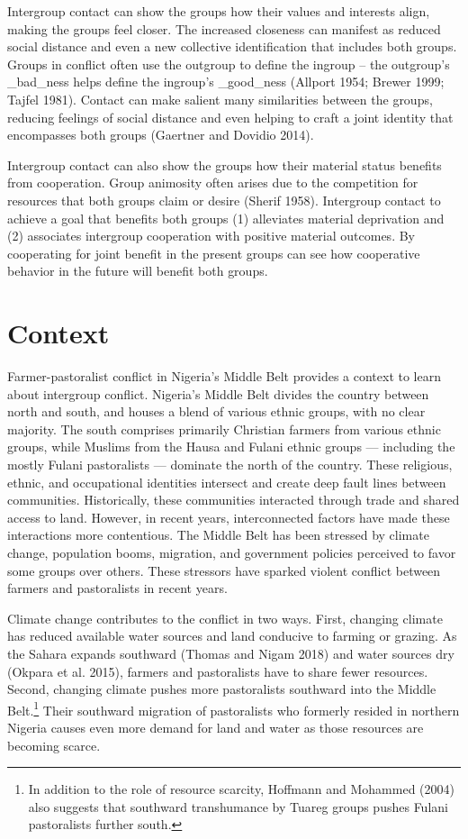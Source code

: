 \documentclass[11pt]{article}
\begin{document}
Intergroup contact can show the groups how their values and interests
align, making the groups feel closer. The increased closeness can
manifest as reduced social distance and even a new collective
identification that includes both groups. Groups in conflict often use
the outgroup to define the ingroup -- the outgroup's \_bad\_ness helps
define the ingroup's \_good\_ness (Allport 1954; Brewer 1999; Tajfel
1981). Contact can make salient many similarities between the groups,
reducing feelings of social distance and even helping to craft a joint
identity that encompasses both groups (Gaertner and Dovidio 2014).

Intergroup contact can also show the groups how their material status
benefits from cooperation. Group animosity often arises due to the
competition for resources that both groups claim or desire (Sherif
1958). Intergroup contact to achieve a goal that benefits both groups
(1) alleviates material deprivation and (2) associates intergroup
cooperation with positive material outcomes. By cooperating for joint
benefit in the present groups can see how cooperative behavior in the
future will benefit both groups.

\hypertarget{context}{%
\section{Context}\label{context}}

Farmer-pastoralist conflict in Nigeria's Middle Belt provides a context
to learn about intergroup conflict. Nigeria's Middle Belt divides the
country between north and south, and houses a blend of various ethnic
groups, with no clear majority. The south comprises primarily Christian
farmers from various ethnic groups, while Muslims from the Hausa and
Fulani ethnic groups --- including the mostly Fulani pastoralists ---
dominate the north of the country. These religious, ethnic, and
occupational identities intersect and create deep fault lines between
communities. Historically, these communities interacted through trade
and shared access to land. However, in recent years, interconnected
factors have made these interactions more contentious. The Middle Belt
has been stressed by climate change, population booms, migration, and
government policies perceived to favor some groups over others. These
stressors have sparked violent conflict between farmers and pastoralists
in recent years.

Climate change contributes to the conflict in two ways. First, changing
climate has reduced available water sources and land conducive to
farming or grazing. As the Sahara expands southward (Thomas and Nigam
2018) and water sources dry (Okpara et al. 2015), farmers and
pastoralists have to share fewer resources. Second, changing climate
pushes more pastoralists southward into the Middle Belt.\footnote{In
  addition to the role of resource scarcity, Hoffmann and Mohammed
  (2004) also suggests that southward transhumance by Tuareg groups
  pushes Fulani pastoralists further south.} Their southward migration
of pastoralists who formerly resided in northern Nigeria causes even
more demand for land and water as those resources are becoming scarce.
\end{document}
